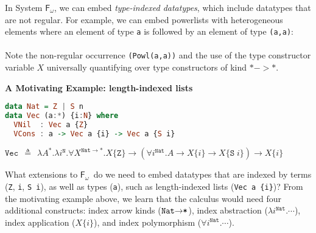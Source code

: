 \documentclass{article}
\newcommand{\Fw}{\ensuremath{\mathsf{F}_\omega}}
\begin{document}
In System \Fw, we can embed \emph{type-indexed datatypes}, which include
datatypes that are not regular. For example, we can embed powerlists with
heterogeneous elements where an element of type \texttt{a} is followed by
an element of type \texttt{(a,a)}:\vspace*{1pt}\\
\vspace*{1pt}\\
Note the non-regular occurrence \texttt{(Powl(a,a))} and
the use of the type constructor variable $X$ universally quantifying over
type constructors of kind $* -> *$.\\
\begin{center}\vspace*{-14pt}
\textbf{A Motivating Example: length-indexed lists} \vspace*{-8pt}
\end{center}
\begin{snugshade}\vspace{-7pt}
\begin{lstlisting}[basicstyle={\small\ttfamily},language=Haskell]
data Nat = Z | S n
data Vec (a:*) {i:N} where
  VNil  : Vec a {Z}
  VCons : a -> Vec a {i} -> Vec a {S i}
\end{lstlisting}\vspace*{-10pt}
\end{snugshade}\vspace*{-15pt}
\begin{snugshade}\noindent
$
\texttt{{Vec}}\:\:\triangleq\:\:\lambda A^{*}.\lambda i^{\texttt{{N}}}.
\forall X^{\texttt{{Nat}}\to*}.
X\{\texttt{{Z}}\}\to
(\forall i^{\texttt{{Nat}}}.A\to X\{i\}\to X\{\texttt{{S}}\; i\})\to X\{i\}
$
\end{snugshade}\vspace*{-5pt}
What extensions to \Fw\ do we need to embed datatypes that are indexed by
terms (\texttt{Z}, \texttt{i}, \texttt{S i}), as well as types (\texttt{a}),
such as length-indexed lists (\verb|Vec a {i}|)? From the motivating example
above, we learn that the calculus would need four additional constructs:
index arrow kinds ($\texttt{{Nat}\ensuremath{\to}*}$),
index abstraction ($\lambda i^{\texttt{{Nat}}}.\cdots$),
index application ($X\{i\}$), and
index polymorphism ($\forall i^{\texttt{{Nat}}}.\cdots$).
\end{document}
